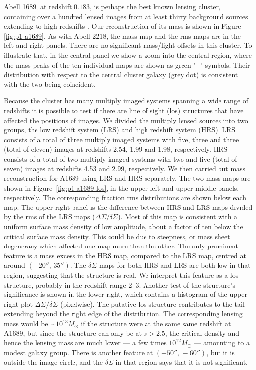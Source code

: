 \documentclass[
  11pt,
  twoside,
  openright,
  titlepage,
  headings=optiontoheadandtoc
]{scrbook}
\begin{document}
Abell 1689, at redshift $0.183$, is perhaps the best known lensing
cluster, containing over a hundred lensed images from at least thirty
background sources extending to high redshifts
\citep{2005ApJ...621...53B}.  Our reconstruction of its mass is shown
in Figure \ref{fig:p1-a1689}.  As with Abell 2218, the mass map and the
rms maps are in the left and right panels. There are no significant
mass/light offsets in this cluster. To illustrate that, in the central
panel we show a zoom into the central region, where the mass peaks of
the ten individual maps are shown as green '+' symbols. Their
distribution with respect to the central cluster galaxy (grey dot) is
consistent with the two being coincident.

Because the cluster has many multiply imaged systems spanning a wide
range of redshifts it is possible to test if there are line of sight
(los) structures that have affected the positions of images. We
divided the multiply lensed sources into two groups, the low redshift
system (LRS) and high redshift system (HRS). LRS consists of a total
of three multiply imaged systems with five, three and three (total of
eleven) images at redshifts 2.54, 1.99 and 1.98, respectively.  HRS
consists of a total of two multiply imaged systems with two and five
(total of seven) images at redshifts 4.53 and 2.99, respectively. We
then carried out mass reconstruction for A1689 using LRS and HRS
separately.  The two mass maps are shown in
Figure~\ref{fig:p1-a1689-los}, in the upper left and upper middle
panels, respectively. The corresponding fraction rms distributions are shown
below each map.  The upper right panel is the difference between HRS
and LRS maps divided by the rms of the LRS maps ($\Delta \Sigma/\delta\Sigma$).  
Most of this map is consistent with a uniform surface
mass density of low amplitude, about a factor of ten below the
critical surface mass density. This could be due to steepness, or mass
sheet degeneracy which affected one map more than the other. The only
prominent feature is a mass excess in the HRS map, compared to the LRS
map, centred at around $(-20'',\,35'')$.  The $\delta\Sigma$ maps for both 
HRS and LRS are both low in that region, suggesting that the structure is
real. We interpret this feature as a los structure, probably in the
redshift range 2--3.  Another test of the structure's significance is shown
in the lower right, which contains a histogram of the upper right plot 
$\Delta\Sigma /\delta\Sigma$ (pixelwise). 
The putative los structure contributes to the tail extending beyond
the right edge of the distribution.
The corresponding lensing mass would be $\sim10^{13}M_\odot$ if the
structure were at the same same redshift at A1689, but since the
structure can only be at $z>2.5$, the critical density and hence the
lensing mass are much lower --- a few times $10^{12}M_\odot$ ---
amounting to a modest galaxy group.  There is another feature at
$(-50'',\,-60'')$, but it is outside the image circle, and the $\delta\Sigma$
in that region says that it is not significant.
\end{document}
